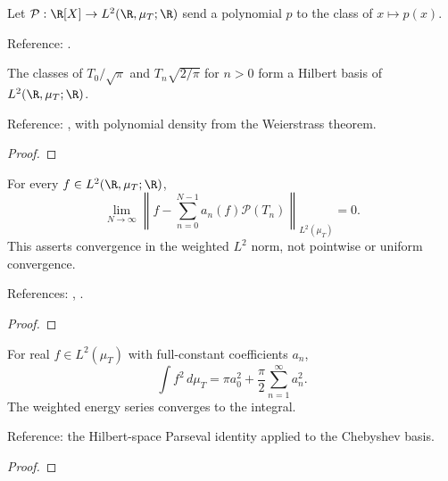 \begin{definition}
\label{def:polynomial-L2}
\leanok

Let $\mathcal P:\R[X]\to L^2(\R,\mu_T;\R)$ send a polynomial $p$ to the class of
$x\mapsto p(x)$.


Reference: \cite[Table 18.3.1]{dlmf}.
\end{definition}

\begin{theorem}
\label{thm:T-basis}
\leanok
{}
The classes of $T_0/\sqrt\pi$ and $T_n\sqrt{2/\pi}$ for $n>0$ form a
Hilbert basis of $L^2(\R,\mu_T;\R)$.

Reference: \cite[Table 18.3.1]{dlmf},
with polynomial density from the Weierstrass theorem.
\end{theorem}
\begin{proof}
\leanok
\end{proof}

\begin{theorem}
\label{thm:T-L2-expansion}
\leanok
{}
For every $f\in L^2(\R,\mu_T;\R)$,
\[\lim_{N\to\infty}\left\|f-\sum_{n=0}^{N-1}a_n(f)\mathcal P(T_n)\right\|_{L^2(\mu_T)}=0.\]
This asserts convergence in the weighted $L^2$ norm, not pointwise or uniform
convergence.

References: \cite[18.2(viii)]{dlmf}, \cite[Chapter 3]{atap}.
\end{theorem}
\begin{proof}
\leanok
\end{proof}

\begin{theorem}
\label{thm:T-parseval}
\leanok
For real $f\in L^2(\mu_T)$ with full-constant coefficients $a_n$,
\[
 \int f^2\,d\mu_T=\pi a_0^2+\frac\pi2\sum_{n=1}^\infty a_n^2.
\]
The weighted energy series converges to the integral.

Reference: the Hilbert-space Parseval identity applied to the Chebyshev basis.
\end{theorem}
\begin{proof}
\leanok
\end{proof}

